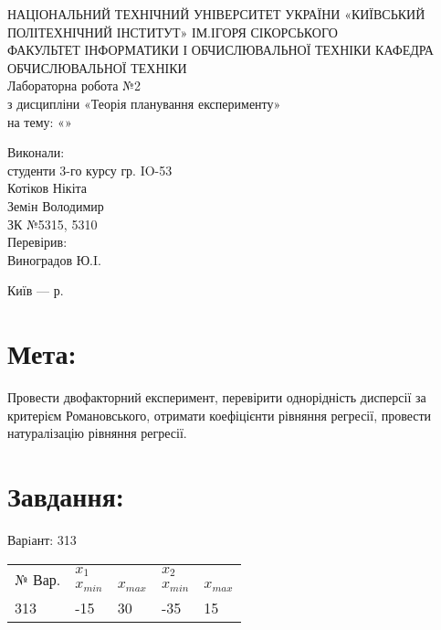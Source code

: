 \documentclass{article}
\begin{document}
    \begin{center}

        \large НАЦІОНАЛЬНИЙ ТЕХНІЧНИЙ УНІВЕРСИТЕТ УКРАЇНИ
        «КИЇВСЬКИЙ ПОЛІТЕХНІЧНИЙ ІНСТИТУТ» ІМ.ІГОРЯ СІКОРСЬКОГО\\
        ФАКУЛЬТЕТ ІНФОРМАТИКИ І ОБЧИСЛЮВАЛЬНОЇ ТЕХНІКИ
        КАФЕДРА ОБЧИСЛЮВАЛЬНОЇ ТЕХНІКИ \\[5.5cm]
    
        \huge Лабораторна робота №2 \\[0.6cm]
        \large з дисципліни «Теорія планування експерименту»\\
        \large на тему: «»\\[3.5cm]
    
    \end{center}
    
    \begin{flushright}
        \large
        Виконали:\\
        студенти 3-го курсу гр. IO-53 \\
        Котіков Нікіта \\
        Земiн Володимир \\
        ЗК №5315, 5310\\
        Перевірив:\\
        Виноградов Ю.I.
    \end{flushright}
    
    
    \vfill
    
    \begin{center}
        \large Київ --- \the\year р.
    \end{center}
    
    \newpage
    \large
    \section*{Мета:}
    Провести двофакторний експеримент, перевірити однорідність дисперсії за
    критерієм Романовського, отримати коефіцієнти рівняння регресії, провести натуралізацію
    рівняння регресії.
    
    \section*{Завдання:}
    Варiант: 313\\
    \begin{tabular}{|l|l|l|l|l|}
        \hline
        \multirow{2}{*}{№ Вар.} & \multicolumn{2}{l|}{$x_1$} & \multicolumn{2}{l|}{$x_2$}                         \\ \cline{2-5}
                                & $x_{min}$                  & $x_{max}$                  & $x_{min}$ & $x_{max}$ \\ \hline
        313                     & -15                        & 30                         & -35       & 15        \\ \hline
    \end{tabular}
    
\end{document}
